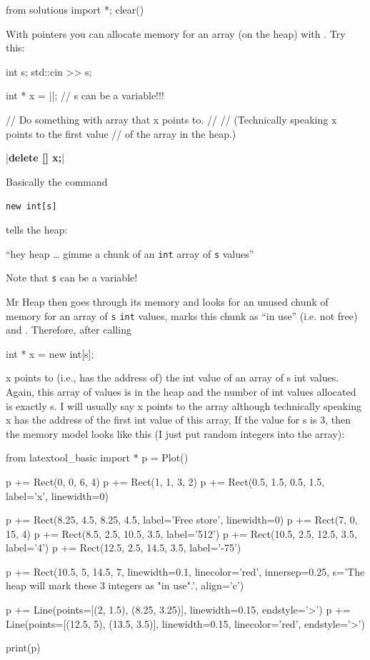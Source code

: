 \begin{python0}
from solutions import *; clear()
\end{python0}

With pointers you can allocate memory for an array (on the heap) with . Try this:

\begin{consolethree}[escapeinside=||]
int s;
std::cin >> s;

int * x = ||; // s can be a variable!!!

// Do something with array that x points to.
//
// (Technically speaking x points to the first value
// of the array in the heap.)

|\textbf{delete [] x;}|
\end{consolethree}

Basically the command

\verb!new int[s]!

tells the heap:

``hey heap \ldots{} gimme a chunk of an \texttt{int} array of \texttt{s} values''

Note that \texttt{s} can be a variable!

Mr Heap then goes through its memory and looks for an unused  chunk of memory for an array of \texttt{s} \texttt{int} values, marks this chunk as ``in use'' (i.e. not free) and \texttt{}. Therefore, after calling

\begin{consolethree}[escapeinside=||]
int * x = new int[s];
\end{consolethree}

x points to (i.e., has the address of) the  int value of an array of s int values. Again, this array of values is in the heap and the number of int values allocated is exactly s. I will usually say x points to the array although technically speaking x has the address of the first int value of this array, If the value for s is 3, then the memory model looks like this (I just put random integers into the array):

\begin{python}
from latextool_basic import *
p = Plot()

p += Rect(0, 0, 6, 4)
p += Rect(1, 1, 3, 2)
p += Rect(0.5, 1.5, 0.5, 1.5, label='x', linewidth=0)

p += Rect(8.25, 4.5, 8.25, 4.5, label='Free store', linewidth=0)
p += Rect(7, 0, 15, 4)
p += Rect(8.5, 2.5, 10.5, 3.5, label='512')
p += Rect(10.5, 2.5, 12.5, 3.5, label='4')
p += Rect(12.5, 2.5, 14.5, 3.5, label='-75')

p += Rect(10.5, 5, 14.5, 7, linewidth=0.1, linecolor='red', innersep=0.25, s='The heap will mark these 3 integers as "in use".', align='c')

p += Line(points=[(2, 1.5), (8.25, 3.25)], linewidth=0.15, endstyle='>')
p += Line(points=[(12.5, 5), (13.5, 3.5)], linewidth=0.15, linecolor='red', endstyle='>')

print(p)
\end{python}

